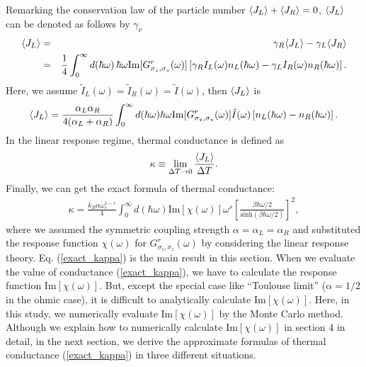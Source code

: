 Remarking the conservation law of the particle number $\langle J _L\rangle+\langle J_R\rangle=0$, $\langle J_L\rangle$ can be denoted as follows by $\gamma_{\nu}$
\begin{eqnarray}
	\langle J _L\rangle&=&\gamma_R\langle J_L\rangle-\gamma_L\langle J_R\rangle\\
	&=&\frac{1}{4}\int_0^{\infty}d(\hbar\omega)\,
	\hbar\omega\mathrm{Im}[G^r_{\sigma_z,\sigma_z}(\omega)]
	\left[\gamma_RI_L(\omega)n_L(\hbar\omega)-\gamma_LI_R(\omega)n_R(\hbar\omega)\right].
\end{eqnarray}
Here, we assume $\tilde{I}_L(\omega)=\tilde{I}_R(\omega)=\tilde{I}(\omega)$, then $\langle J_L\rangle$ is
\begin{eqnarray}
	\langle J _L\rangle=\frac{\alpha_L\alpha_R}{4(\alpha_L+\alpha_R)}\int_0^{\infty}d(\hbar\omega)
		\hbar\omega\mathrm{Im}[G^r_{\sigma_z,\sigma_z}(\omega)]
		\tilde{I }(\omega)\left[n_L(\hbar\omega)-n_R(\hbar\omega)\right].
		\label{exact_current}
\end{eqnarray}
In the linear response regime, thermal conductance is defined as
\begin{eqnarray}
	\kappa\equiv \lim_{\Delta T \rightarrow 0} \frac{\langle J_L\rangle}{\Delta T}.
	\label{den_kappa}
\end{eqnarray}
Finally, we can get the exact formula of thermal conductance: 
\begin{eqnarray}
	\kappa=\frac{k_B\alpha\omega_c^{1-s}}{4}\int_{0}^{\infty}d(\hbar\omega)\mathrm{Im}
	[\chi(\omega)]\omega^s\left[\frac{\beta\hbar\omega/2}{\mathrm{sinh}(\beta\hbar\omega/2)}\right]^2,
	\label{exact_kappa}
\end{eqnarray}
where we assumed  the symmetric coupling strength $\alpha=\alpha_L=\alpha_R$ and substituted the response function $\chi(\omega)$ for $G^r_{\sigma_z,\sigma_z}(\omega)$ by considering the linear response theory.
Eq. (\ref{exact_kappa}) is the main result in this section.
When we evaluate the value of conductance (\ref{exact_kappa}), we have to calculate the response function $\mathrm{Im}[{\chi}(\omega)]$. But, except the special case like ``Toulouse limit'' ($\alpha=1/2$ in the ohmic case), it is difficult to analytically calculate $\mathrm{Im}[{\chi}(\omega)]$.
Here, in this study, we numerically evaluate $\mathrm{Im}[{\chi}(\omega)]$ by the Monte Carlo method.
Although we explain how to numerically calculate $\mathrm{Im}[{\chi}(\omega)]$ in section 4 in detail,
in the next section, we derive the approximate formulas of thermal conductance (\ref{exact_kappa}) in three different situations.  